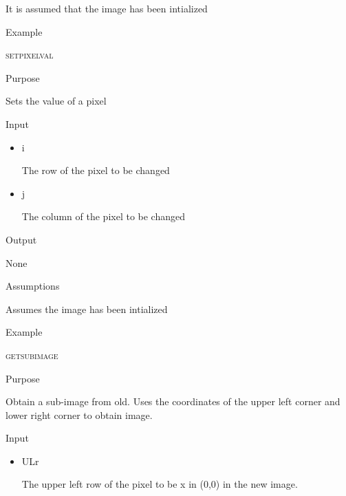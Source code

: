 \documentclass[pdftex, 11pt]{article}
\begin{document}
\begin{description}
\begin{description}
				It is assumed that the image has been intialized

			\item{Example}


		\end{description}


	\item{\textsc{setpixelval}}
		\begin{description}
			\item{Purpose}

				Sets the value of a pixel

			\item{Input}

				\begin{itemize}

					\item{i}

						The row of the pixel to be changed

					\item{j}

						The column of the pixel to be changed

				\end{itemize}

			\item{Output}

				None

			\item{Assumptions}

				Assumes the image has been intialized

			\item{Example}

		\end{description}


	\item{\textsc{getsubimage}}
		\begin{description}
			\item{Purpose}

 				Obtain a sub-image from old.  Uses the coordinates
				of the upper left corner
				and lower right corner to obtain image.

			\item{Input}

				\begin{itemize}

					\item{ULr}
	
						The upper left row of the pixel
						to be x in (0,0) in the new image.


\end{itemize}
\end{description}
\end{description}
\end{document}
